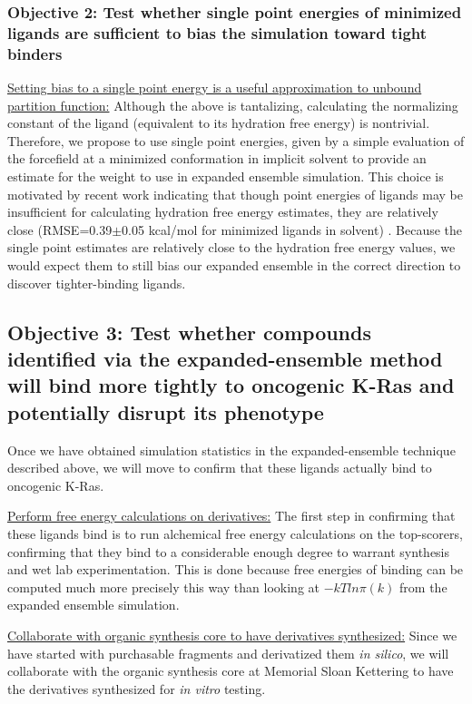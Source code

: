 \documentclass[12pt]{article}
\begin{document}
\subsubsection*{Objective 2: Test whether single point energies of minimized ligands are sufficient to bias the simulation toward tight binders }


\underline{Setting bias to a single point energy is a useful approximation to unbound partition function:} Although the above is tantalizing, calculating the normalizing constant of the ligand (equivalent to its hydration free energy) is nontrivial. Therefore, we propose to use single point energies, given by a simple evaluation of the forcefield at a minimized conformation in implicit solvent to provide an estimate for the weight to use in expanded ensemble simulation. This choice is motivated by recent work \cite{mobley2008} indicating that though point energies of ligands may be insufficient for calculating hydration free energy estimates, they are relatively close (RMSE=0.39$\pm$0.05 kcal/mol for minimized ligands in solvent) \cite{mobley2008}. Because the single point estimates are relatively close to the hydration free energy values, we would expect them to still bias our expanded ensemble in the correct direction to discover tighter-binding ligands. 


\subsection*{Objective 3: Test whether compounds identified via the expanded-ensemble method will bind more tightly to oncogenic K-Ras and potentially disrupt its phenotype}

Once we have obtained simulation statistics in the expanded-ensemble technique described above, we will move to confirm that these ligands actually bind to oncogenic K-Ras.

\underline{Perform free energy calculations on derivatives:} The first step in confirming that these ligands bind is to run alchemical free energy calculations on the top-scorers, confirming that they bind to a considerable enough degree to warrant synthesis and wet lab experimentation. This is done because free energies of binding can be computed much more precisely this way than looking at $-kT ln \pi(k)$ from the expanded ensemble simulation.

\underline{Collaborate with organic synthesis core to have derivatives synthesized:} Since we have started with purchasable fragments and derivatized them \textit{in silico}, we will collaborate with the organic synthesis core at Memorial Sloan Kettering to have the derivatives synthesized for \textit{in vitro} testing.
\end{document}
